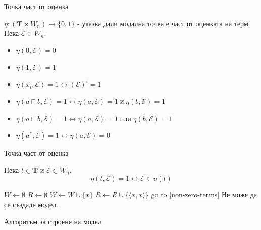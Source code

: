 \documentclass[14pt, aspectratio=169]{beamer}
\renewcommand\thealgorithm{}
\newcommand\E{\mathcal{E}}
\newcommand\Tb{\mathbf{T}}
\newcommand{\pair}[2]{ \langle #1, #2 \rangle }
\newcommand{\pairXX}{ \pair{x}{x} }
\def\iff{\leftrightarrow}
\begin{document}
\begin{frame}{Точка част от оценка}
		\begin{definition}[$\eta$]
			$\eta: (\Tb \times W_n) \rightarrow \{0, 1 \}$ - указва дали модална точка е част от оценката на терм. Нека $\E \in W_n$.
			\begin{itemize}
				\item $\eta(0, \E) = 0$
				\item $\eta(1, \E) = 1$
				\item $\eta(x_i, \E) = 1 \iff (\E)^i = 1$
				\item $\eta(a \sqcap b, \E) = 1 \iff \eta(a, \E) = 1 \; и \; \eta(b, \E) = 1$
				\item $\eta(a \sqcup b, \E) = 1 \iff \eta(a, \E) = 1 \; или \; \eta(b, \E) = 1$
				\item $\eta(a^*, \E) = 1 \iff \eta(a, \E) = 0$
			\end{itemize}
		\end{definition}
\end{frame}

\begin{frame}{Точка част от оценка}
	\begin{lemma}
		Нека $t \in \Tb$ и $\E \in W_n$.
		\begin{equation*}
			\eta(t, \E) = 1 \iff \E \in \upsilon(t)
		\end{equation*}
	\end{lemma}
\end{frame}

\begin{frame}
	\begin{algorithm}[H]
	\renewcommand\thealgorithm{} %
	\begin{algorithmic}[1] %
		\STATE $W \gets \emptyset$
		\STATE $R \gets \emptyset$
		 \label{non-zero-terms}
					\STATE $W \gets W \cup \{ x \}$
					\STATE $R \gets R \cup \{ \pairXX \}$
					\STATE go to \ref{non-zero-terms}
				\ENDIF
			\ENDFOR
			\STATE Не може да се създаде модел.
		\ENDFOR
	\end{algorithmic}

	\caption{Алгоритъм за строене на модел}
	\label{alg:seq}
	\end{algorithm}
\end{frame}
\end{document}
